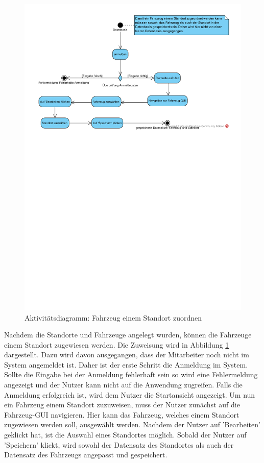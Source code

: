 \begin{figure}[!ht]
    \centering
    \includegraphics[width=\textwidth, trim = 0cm 11cm 0cm 0cm]{Bilder/Diagramme/FahrzeugStandortZuordnen.pdf}
    \caption{Aktivitätsdiagramm: Fahrzeug einem Standort zuordnen}
    \label{img:fahrzeugzuordnen}
\end{figure}

Nachdem die Standorte und Fahrzeuge angelegt wurden, können die Fahrzeuge einem Standort zugewiesen werden. Die Zuweisung wird in Abbildung \ref{img:fahrzeugzuordnen} dargestellt. Dazu wird davon ausgegangen, dass der Mitarbeiter noch nicht im System angemeldet ist. Daher ist der erste Schritt die Anmeldung im System. Sollte die Eingabe bei der Anmeldung fehlerhaft sein so wird eine Fehlermeldung angezeigt und der Nutzer kann nicht auf die Anwendung zugreifen. Falls die Anmeldung erfolgreich ist, wird dem Nutzer die Startansicht angezeigt. Um nun ein Fahrzeug einem Standort zuzuweisen, muss der Nutzer zunächst auf die Fahrzeug-GUI navigieren. Hier kann das Fahrzeug, welches einem Standort zugewiesen werden soll, ausgewählt werden. Nachdem der Nutzer auf 'Bearbeiten' geklickt hat, ist die Auswahl eines Standortes möglich. Sobald der Nutzer auf 'Speichern' klickt, wird sowohl der Datensatz des Standortes als auch der Datensatz des Fahrzeugs angepasst und gespeichert.

